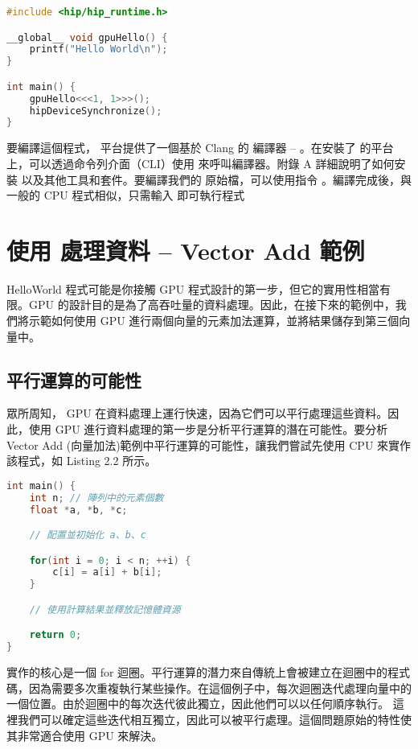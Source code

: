 \begin{lstlisting}[language=C, caption={「Hello World」\term{HIP}程式範例}, label={lst:example}]
#include <hip/hip_runtime.h>

__global__ void gpuHello() {
    printf("Hello World\n");
}

int main() {
    gpuHello<<<1, 1>>>();
    hipDeviceSynchronize();
}
\end{lstlisting}

要編譯這個程式， 平台提供了一個基於 Clang 的  編譯器 -- 。在安裝了  的平台上，可以透過命令列介面（CLI）使用  來呼叫編譯器。附錄 A 詳細說明了如何安裝  以及其他工具和套件。要編譯我們的  原始檔，可以使用指令  。編譯完成後，與一般的 CPU 程式相似，只需輸入  即可執行程式

\section{使用  處理資料 -- Vector Add 範例}

HelloWorld 程式可能是你接觸 GPU 程式設計的第一步，但它的實用性相當有限。GPU 的設計目的是為了高吞吐量的資料處理。因此，在接下來的範例中，我們將示範如何使用 GPU 進行兩個向量的元素加法運算，並將結果儲存到第三個向量中。

\subsection{平行運算的可能性}

眾所周知， GPU 在資料處理上運行快速，因為它們可以平行處理這些資料。因此，使用 GPU 進行資料處理的第一步是分析平行運算的潛在可能性。要分析 Vector Add (向量加法)範例中平行運算的可能性，讓我們嘗試先使用 CPU 來實作該程式，如 Listing 2.2 所示。
\begin{lstlisting}[language=C, caption={\term{HIP} 錯誤偵測範例}, label={2nd:example}]
int main() {
    int n; // 陣列中的元素個數
    float *a, *b, *c;

    // 配置並初始化 a、b、c

    for(int i = 0; i < n; ++i) {
        c[i] = a[i] + b[i];
    }

    // 使用計算結果並釋放記憶體資源

    return 0;
}
\end{lstlisting}

實作的核心是一個 for 迴圈。平行運算的潛力來自傳統上會被建立在迴圈中的程式碼，因為需要多次重複執行某些操作。在這個例子中，每次迴圈迭代處理向量中的一個位置。由於迴圈中的每次迭代彼此獨立，因此他們可以以任何順序執行。
這裡我們可以確定這些迭代相互獨立，因此可以被平行處理。這個問題原始的特性使其非常適合使用 GPU 來解決。

